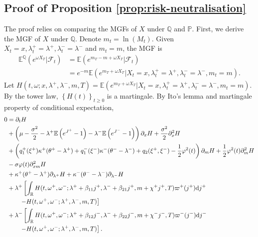 \documentclass[11pt,a4paper]{article}
\numberwithin{equation}{section}
\theoremstyle{remark}
\theoremstyle{definition}
\newcommand{\E}{{\mathbb{E}}}
\newcommand{\dd}{{\rm d}}
\begin{document}
\subsection{Proof of Proposition \ref{prop:risk-neutralisation}}\label{proof:prop:risk-neutralisation}
The proof relies on comparing the MGFs of $X$ under $\mathbb{Q}$ and $\mathbb{P}$.
First, we derive the MGF of $X$ under $\mathbb{Q}$. Denote $m_t=\ln(M_t)$.
Given $X_t=x, \lambda_t^+=\lambda^+, \lambda_t^-=\lambda^-$ and $m_t=m$, the MGF is
\begin{align*}
    \E^\mathbb{Q}\left(e^{\omega X_T}\big|\mathcal{F}_t\right) &= \E\left(e^{m_T-m+\omega X_T}\big|\mathcal{F}_t\right)\\
    &= e^{-m}\E\left(e^{m_T+\omega X_T}\big|X_t=x, \lambda^+_t=\lambda^+, \lambda^-_t=\lambda^-, m_t=m\right).
\end{align*}
Let $H(t, \omega; x, \lambda^+, \lambda^-, m, T) = \E\left(e^{m_T+\omega X_T}\big|X_t=x, \lambda^+_t=\lambda^+, \lambda^-_t=\lambda^-, m_t=m\right)$. By the tower law, $\left\{H(t)\right\}_{t \geq 0}$ is a martingale.
By Ito's lemma and martingale property of conditional expectation,
\begin{align*}
    0 &= \partial_t H \\
    &+ \left(\mu-\frac{\sigma^2}{2}-\lambda^+\E\left(e^{J^+}-1\right)-\lambda^-\E\left(e^{J^-}-1\right)\right)\partial_x H+\frac{\sigma^2}{2}\partial^2_x H\\
    &+\left(q^+_1(\xi^+)\kappa^+(\theta^+-\lambda^+)+q^-_1(\xi^-)\kappa^-(\theta^--\lambda^-)+q_2(\xi^+,\xi^-)-\frac{1}{2}\varphi^2(t)\right)\partial_m H
     +\frac{1}{2}\varphi^2(t)\partial^2_m H\\
    &-\sigma\varphi(t)\partial^2_{xm}H\\
    &+\kappa^+(\theta^+-\lambda^+)\partial_{\lambda^+} H
     +\kappa^-(\theta^--\lambda^-)\partial_{\lambda^-} H\\
    &+\lambda^+ \left[\int_\mathbb{R}H(t, \omega^+, \omega^-; \lambda^++\beta_{11}j^+, \lambda^-+\beta_{21}j^+, m+\chi^+j^+, T)\varpi^+(j^+)\dd j^+\right.\\
    &\qquad\left. - H(t, \omega^+, \omega^-; \lambda^+, \lambda^-, m, T)\right]\\
    &+\lambda^- \left[\int_\mathbb{R}H(t, \omega^+, \omega^-; \lambda^++\beta_{12}j^-, \lambda^-+\beta_{22}j^-, m+\chi^-j^-, T)\varpi^-(j^-)\dd j^-\right.\\
    &\qquad\left. - H(t, \omega^+, \omega^-; \lambda^+, \lambda^-, m, T)\right].
\end{align*}
\end{document}
